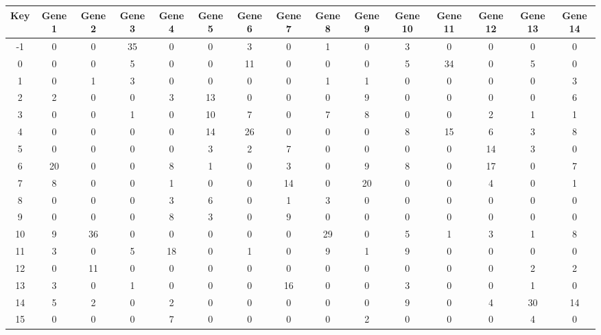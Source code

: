 \begin{tabular}{|c|c|c|c|c|c|c|c|c|c|c|c|c|c|c|}
\hline
Key & Gene 1 & Gene 2 & Gene 3 & Gene 4 & Gene 5 & Gene 6 & Gene 7 & Gene 8 & Gene 9 & Gene 10 & Gene 11 & Gene 12 & Gene 13 & Gene 14 \\
\hline
-1 & 0 & 0 & 35 & 0 & 0 & 3 & 0 & 1 & 0 & 3 & 0 & 0 & 0 & 0 \\
0 & 0 & 0 & 5 & 0 & 0 & 11 & 0 & 0 & 0 & 5 & 34 & 0 & 5 & 0 \\
1 & 0 & 1 & 3 & 0 & 0 & 0 & 0 & 1 & 1 & 0 & 0 & 0 & 0 & 3 \\
2 & 2 & 0 & 0 & 3 & 13 & 0 & 0 & 0 & 9 & 0 & 0 & 0 & 0 & 6 \\
3 & 0 & 0 & 1 & 0 & 10 & 7 & 0 & 7 & 8 & 0 & 0 & 2 & 1 & 1 \\
4 & 0 & 0 & 0 & 0 & 14 & 26 & 0 & 0 & 0 & 8 & 15 & 6 & 3 & 8 \\
5 & 0 & 0 & 0 & 0 & 3 & 2 & 7 & 0 & 0 & 0 & 0 & 14 & 3 & 0 \\
6 & 20 & 0 & 0 & 8 & 1 & 0 & 3 & 0 & 9 & 8 & 0 & 17 & 0 & 7 \\
7 & 8 & 0 & 0 & 1 & 0 & 0 & 14 & 0 & 20 & 0 & 0 & 4 & 0 & 1 \\
8 & 0 & 0 & 0 & 3 & 6 & 0 & 1 & 3 & 0 & 0 & 0 & 0 & 0 & 0 \\
9 & 0 & 0 & 0 & 8 & 3 & 0 & 9 & 0 & 0 & 0 & 0 & 0 & 0 & 0 \\
10 & 9 & 36 & 0 & 0 & 0 & 0 & 0 & 29 & 0 & 5 & 1 & 3 & 1 & 8 \\
11 & 3 & 0 & 5 & 18 & 0 & 1 & 0 & 9 & 1 & 9 & 0 & 0 & 0 & 0 \\
12 & 0 & 11 & 0 & 0 & 0 & 0 & 0 & 0 & 0 & 0 & 0 & 0 & 2 & 2 \\
13 & 3 & 0 & 1 & 0 & 0 & 0 & 16 & 0 & 0 & 3 & 0 & 0 & 1 & 0 \\
14 & 5 & 2 & 0 & 2 & 0 & 0 & 0 & 0 & 0 & 9 & 0 & 4 & 30 & 14 \\
15 & 0 & 0 & 0 & 7 & 0 & 0 & 0 & 0 & 2 & 0 & 0 & 0 & 4 & 0 \\
\hline
\end{tabular}
